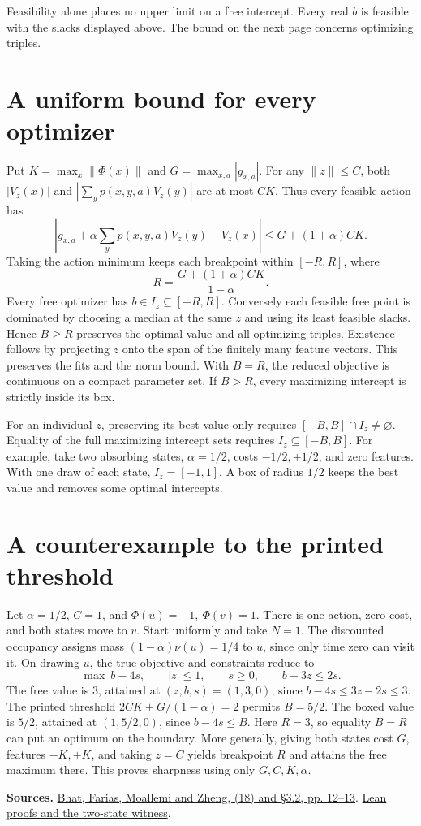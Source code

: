 \documentclass[12pt,a4paper]{article}
\begin{document}
Feasibility alone places no upper limit on a free intercept. Every real
\(b\) is feasible with the slacks displayed above. The bound on the next
page concerns optimizing triples.

\newpage
\section*{A uniform bound for every optimizer}
Put \(K=\max_x\|\Phi(x)\|\) and \(G=\max_{x,a}|g_{x,a}|\). For any
\(\|z\|\le C\), both \(|V_z(x)|\) and \(|\sum_y p(x,y,a)V_z(y)|\)
are at most \(CK\). Thus every feasible action has
\[
 \left|g_{x,a}+\alpha\sum_y p(x,y,a)V_z(y)-V_z(x)\right|
 \le G+(1+\alpha)CK .
\]
Taking the action minimum keeps each breakpoint within \([-R,R]\), where
\[
 \boxed{\displaystyle R=\frac{G+(1+\alpha)CK}{1-\alpha}.}
\]
Every free optimizer has \(b\in I_z\subseteq[-R,R]\). Conversely each
feasible free point is dominated by choosing a median at the same \(z\)
and using its least feasible slacks. Hence \(B\ge R\) preserves the
optimal value and all optimizing triples. Existence follows by projecting
\(z\) onto the span of the finitely many feature vectors. This preserves
the fits and the norm bound. With \(B=R\), the reduced objective is
continuous on a compact parameter set.
If \(B>R\), every maximizing intercept is strictly inside its box.

For an individual \(z\), preserving its best value only requires
\([-B,B]\cap I_z\ne\varnothing\). Equality of the full maximizing
intercept sets requires \(I_z\subseteq[-B,B]\). For example, take two
absorbing states, \(\alpha=1/2\), costs \(-1/2,+1/2\), and zero features.
With one draw of each state, \(I_z=[-1,1]\). A box of radius \(1/2\)
keeps the best value and removes some optimal intercepts.

\section*{A counterexample to the printed threshold}
Let \(\alpha=1/2\), \(C=1\), and \(\Phi(u)=-1,\ \Phi(v)=1\).
There is one action, zero cost, and both states move to \(v\). Start
uniformly and take \(N=1\). The discounted occupancy assigns mass
\((1-\alpha)\nu(u)=1/4\) to \(u\), since only time zero can visit it.
On drawing \(u\), the true objective and constraints reduce to
\[
 \max\ b-4s,\qquad |z|\le1,\qquad s\ge0,\qquad b-3z\le2s.
\]
The free value is \(3\), attained at \((z,b,s)=(1,3,0)\), since \(b-4s\le3z-2s\le3\). The printed threshold
\(2CK+G/(1-\alpha)=2\) permits \(B=5/2\). The boxed value is
\(5/2\), attained at \((1,5/2,0)\), since \(b-4s\le B\).
Here \(R=3\), so equality \(B=R\) can put an optimum on the boundary.
More generally, giving both states cost \(G\), features \(-K,+K\),
and taking \(z=C\) yields breakpoint \(R\) and attains the free
maximum there. This proves sharpness using only \(G,C,K,\alpha\).

{\small\textbf{Sources.}
\href{https://moallemi.com/ciamac/papers/kernel-adp-2012.pdf\#page=12}{Bhat, Farias, Moallemi and Zheng, (18) and \S3.2, pp. 12--13}.
\href{https://github.com/nikhilpb/kadp/blob/main/lean/Offset.lean}{Lean proofs and the two-state witness}.}
\end{document}
